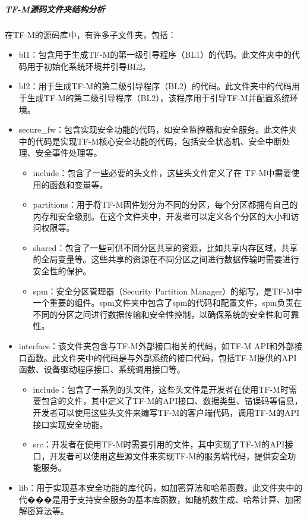 \documentclass[12pt,a4paper]{ctexart}
\numberwithin{figure}{section}
\begin{document}
\subparagraph{TF-M源码文件夹结构分析}
\par 在TF-M的源码库中，有许多子文件夹，包括：
\begin{itemize}
    \item bl1：包含用于生成TF-M的第一级引导程序（BL1）的代码。此文件夹中的代码用于初始化系统环境并引导BL2。
    \item bl2：用于生成TF-M的第二级引导程序（BL2）的代码。此文件夹中的代码用于生成TF-M的第二级引导程序（BL2），该程序用于引导TF-M并配置系统环境。
    \item secure\_fw：包含实现安全功能的代码，如安全监控器和安全服务。此文件夹中的代码是实现TF-M核心安全功能的代码，包括安全状态机、安全中断处理、安全事件处理等。
          \begin{itemize}
              \item include：包含了一些必要的头文件，这些头文件定义了在    TF-M中需要使用的函数和变量等。
              \item partitions：用于将TF-M固件划分为不同的分区，每个分区都拥有自己的内存和安全级别。在这个文件夹中，开发者可以定义各个分区的大小和访问权限等。
              \item shared：包含了一些可供不同分区共享的资源，比如共享内存区域，共享的全局变量等。这些共享的资源在不同分区之间进行数据传输时需要进行安全性的保护。
              \item spm：安全分区管理器（Security Partition Manager）的缩写，是TF-M中一个重要的组件。spm文件夹中包含了spm的代码和配置文件，spm负责在不同的分区之间进行数据传输和安全性控制，以确保系统的安全性和可靠性。
          \end{itemize}
    \item interface：该文件夹包含与TF-M外部接口相关的代码，如TF-M API和外部接口函数。此文件夹中的代码是与外部系统的接口代码，包括TF-M提供的API函数、设备驱动程序接口、系统调用接口等。
          \begin{itemize}
              \item include：包含了一系列的头文件，这些头文件是开发者在使用TF-M时需要包含的文件，其中定义了TF-M的API接口、数据类型、错误码等信息，开发者可以使用这些头文件来编写TF-M的客户端代码，调用TF-M的API接口实现安全功能。
              \item src：开发者在使用TF-M时需要引用的文件，其中实现了TF-M的API接口，开发者可以使用这些源文件来实现TF-M的服务端代码，提供安全功能服务。
          \end{itemize}
    \item lib：用于实现基本安全功能的库代码，如加密算法和哈希函数。此文件夹中的代���是用于支持安全服务的基本库函数，如随机数生成、哈希计算、加密解密算法等。

\end{itemize}
\end{document}
